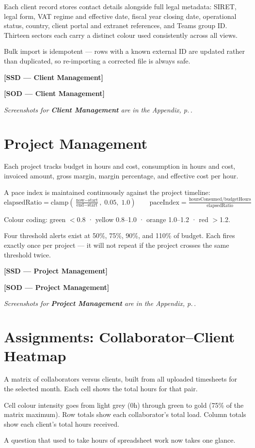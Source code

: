 \documentclass[12pt,a4paper]{report}
\newcommand{\ssd}[1]{\begin{placeholder}\textbf{[SSD --- #1]}\end{placeholder}\vspace{2pt}}
\newcommand{\sod}[1]{\begin{placeholder}\textbf{[SOD --- #1]}\end{placeholder}\vspace{4pt}}
\newcommand{\annexref}[1]{\begin{screenshotbox}\small\textit{Screenshots for \textbf{#1} are in the Appendix, p.\,\pageref{annex:#1}.}\end{screenshotbox}\vspace{4pt}}
\begin{document}
Each client record stores contact details alongside full legal metadata: SIRET,
legal form, VAT regime and effective date, fiscal year closing date, operational
status, country, client portal and extranet references, and Teams group ID.
Thirteen sectors each carry a distinct colour used consistently across all views.

Bulk import is idempotent --- rows with a known external ID are updated rather than
duplicated, so re-importing a corrected file is always safe.

\ssd{Client Management}
\sod{Client Management}
\annexref{Client Management}

\section{Project Management}

Each project tracks budget in hours and cost, consumption in hours and cost,
invoiced amount, gross margin, margin percentage, and effective cost per hour.

A pace index is maintained continuously against the project timeline:
\[
  \text{elapsedRatio} = \text{clamp}\!\left(\tfrac{\text{now}-\text{start}}{\text{end}-\text{start}},\;0.05,\;1.0\right)
  \qquad
  \text{paceIndex} = \tfrac{\text{hoursConsumed}/\text{budgetHours}}{\text{elapsedRatio}}
\]

Colour coding: green $<$0.8 · yellow 0.8--1.0 · orange 1.0--1.2 · red $>$1.2.

Four threshold alerts exist at 50\%, 75\%, 90\%, and 110\% of budget. Each fires
exactly once per project --- it will not repeat if the project crosses the same
threshold twice.

\ssd{Project Management}
\sod{Project Management}
\annexref{Project Management}

\section{Assignments: Collaborator--Client Heatmap}

A matrix of collaborators versus clients, built from all uploaded timesheets for the
selected month. Each cell shows the total hours for that pair.

Cell colour intensity goes from light grey (0h) through green to gold (75\% of the
matrix maximum). Row totals show each collaborator's total load. Column totals show
each client's total hours received.

A question that used to take hours of spreadsheet work now takes one glance.
\end{document}
